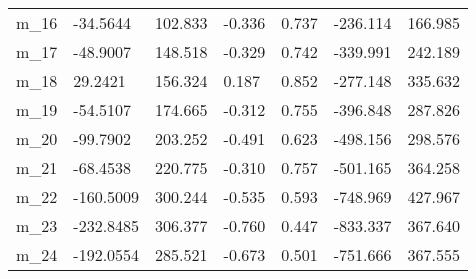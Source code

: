 \begin{tabular}{lllllll}
m_16 &   -34.5644 &   102.833 &    -0.336 &  0.737 &  -236.114 &   166.985 \\
m_17 &   -48.9007 &   148.518 &    -0.329 &  0.742 &  -339.991 &   242.189 \\
m_18 &    29.2421 &   156.324 &     0.187 &  0.852 &  -277.148 &   335.632 \\
m_19 &   -54.5107 &   174.665 &    -0.312 &  0.755 &  -396.848 &   287.826 \\
m_20 &   -99.7902 &   203.252 &    -0.491 &  0.623 &  -498.156 &   298.576 \\
m_21 &   -68.4538 &   220.775 &    -0.310 &  0.757 &  -501.165 &   364.258 \\
m_22 &  -160.5009 &   300.244 &    -0.535 &  0.593 &  -748.969 &   427.967 \\
m_23 &  -232.8485 &   306.377 &    -0.760 &  0.447 &  -833.337 &   367.640 \\
m_24 &  -192.0554 &   285.521 &    -0.673 &  0.501 &  -751.666 &   367.555 \\
\bottomrule
\end{tabular}
